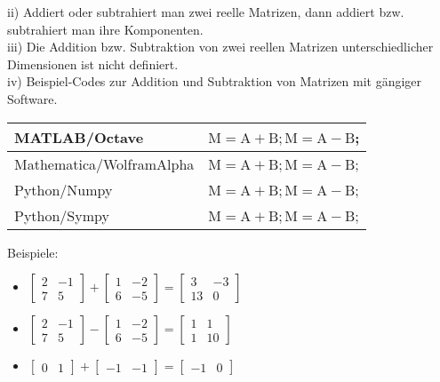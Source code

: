 \documentclass[10pt]{article}
\begin{document}
ii) Addiert oder subtrahiert man zwei reelle Matrizen, dann addiert bzw. subtrahiert man ihre Komponenten.\\
iii) Die Addition bzw. Subtraktion von zwei reellen Matrizen unterschiedlicher Dimensionen ist nicht definiert.\\
iv) Beispiel-Codes zur Addition und Subtraktion von Matrizen mit gängiger Software.

\begin{center}
\begin{tabular}{|l|l|}
\hline
MATLAB/Octave & $\mathrm{M}=\mathrm{A}+\mathrm{B} ; \mathrm{M}=\mathrm{A}-\mathrm{B}$; \\
\hline
Mathematica/WolframAlpha & $\mathrm{M}=\mathrm{A}+\mathrm{B} ; \mathrm{M}=\mathrm{A}-\mathrm{B}$; \\
\hline
Python/Numpy & $\mathrm{M}=\mathrm{A}+\mathrm{B} ; \mathrm{M}=\mathrm{A}-\mathrm{B}$; \\
\hline
Python/Sympy & $\mathrm{M}=\mathrm{A}+\mathrm{B} ; \mathrm{M}=\mathrm{A}-\mathrm{B}$; \\
\hline
\end{tabular}
\end{center}

Beispiele:

\begin{itemize}
  \item $\left[\begin{array}{rr}2 & -1 \\ 7 & 5\end{array}\right]+\left[\begin{array}{ll}1 & -2 \\ 6 & -5\end{array}\right]=\left[\begin{array}{rr}3 & -3 \\ 13 & 0\end{array}\right]$
  \item $\left[\begin{array}{rr}2 & -1 \\ 7 & 5\end{array}\right]-\left[\begin{array}{ll}1 & -2 \\ 6 & -5\end{array}\right]=\left[\begin{array}{rr}1 & 1 \\ 1 & 10\end{array}\right]$
  \item $\left[\begin{array}{ll}0 & 1\end{array}\right]+\left[\begin{array}{ll}-1 & -1\end{array}\right]=\left[\begin{array}{ll}-1 & 0\end{array}\right]$
\end{itemize}
\end{document}
